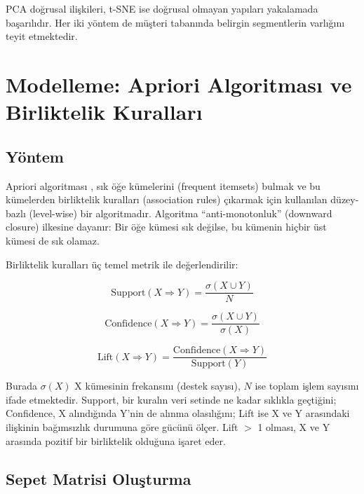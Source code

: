 \documentclass[conference]{IEEEtran}
\begin{document}
PCA doğrusal ilişkileri, t-SNE ise doğrusal olmayan yapıları yakalamada başarılıdır. Her iki yöntem de müşteri tabanında belirgin segmentlerin varlığını teyit etmektedir.

\section{Modelleme: Apriori Algoritması ve Birliktelik Kuralları}

\subsection{Yöntem}

Apriori algoritması \cite{agrawal1994}, sık öğe kümelerini (frequent itemsets) bulmak ve bu kümelerden birliktelik kuralları (association rules) çıkarmak için kullanılan düzey-bazlı (level-wise) bir algoritmadır. Algoritma ``anti-monotonluk'' (downward closure) ilkesine dayanır: Bir öğe kümesi sık değilse, bu kümenin hiçbir üst kümesi de sık olamaz.

Birliktelik kuralları üç temel metrik ile değerlendirilir:

\begin{equation}
\text{Support}(X \Rightarrow Y) = \frac{\sigma(X \cup Y)}{N}
\end{equation}

\begin{equation}
\text{Confidence}(X \Rightarrow Y) = \frac{\sigma(X \cup Y)}{\sigma(X)}
\end{equation}

\begin{equation}
\text{Lift}(X \Rightarrow Y) = \frac{\text{Confidence}(X \Rightarrow Y)}{\text{Support}(Y)}
\end{equation}

Burada $\sigma(X)$ X kümesinin frekansını (destek sayısı), $N$ ise toplam işlem sayısını ifade etmektedir. Support, bir kuralın veri setinde ne kadar sıklıkla geçtiğini; Confidence, X alındığında Y'nin de alınma olasılığını; Lift ise X ve Y arasındaki ilişkinin bağımsızlık durumuna göre gücünü ölçer. Lift $>$ 1 olması, X ve Y arasında pozitif bir birliktelik olduğuna işaret eder.

\subsection{Sepet Matrisi Oluşturma}
\end{document}
